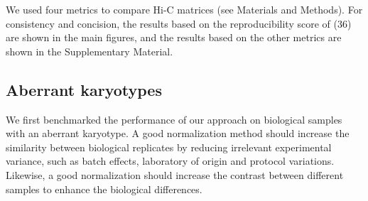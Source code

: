 \documentclass[a4,center,fleqn]{NAR}
\providecommand{\DIFadd}[1]{{\protect\color{red}#1}} %
\providecommand{\DIFdel}[1]{{\protect}}                      %
\providecommand{\DIFaddbegin}{} %
\providecommand{\DIFaddend}{} %
\providecommand{\DIFdelbegin}{} %
\providecommand{\DIFdelend}{} %
\begin{document}
We used four metrics to compare Hi-C matrices (see Materials and Methods).
For consistency and concision, the results based on the reproducibility
score of (\DIFdelbegin \DIFdel{33}\DIFdelend \DIFaddbegin \DIFadd{36}\DIFaddend ) are shown in the main figures, and the
results based on the other metrics are shown in the Supplementary
Material.


%
%
%



\subsection{Aberrant karyotypes}

We first benchmarked the performance of our approach on biological
samples with an aberrant karyotype. A good normalization method should
increase the similarity between biological replicates by reducing
irrelevant experimental variance, such as batch effects, laboratory of
origin and protocol variations. Likewise, a good normalization should
increase the contrast between different samples to enhance the
biological differences.
\end{document}
